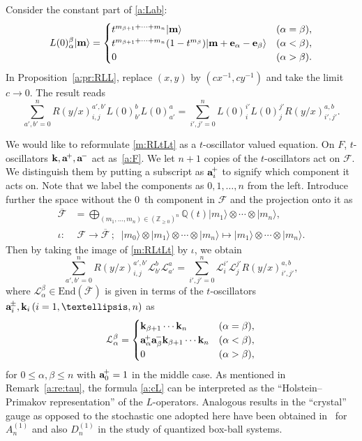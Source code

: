 \documentclass[11pt]{article}
\theoremstyle{definition}
\numberwithin{equation}{section}
\newcommand{\Z}{{\mathbb Z}}
\newcommand{\am}{{\rm\aaa}^{\!-} }
\newcommand{\ap}{{\rm\aaa}^{\!+} }
\newcommand{\apm}{{\rm\aaa}^{\!\pm} }
\newcommand{\F}{\mathcal{F}}
\newcommand{\ket}[1]{\lvert #1 \rangle}
\newcommand{\aaa}{\mathbf{a}}
\newcommand{\kk}{\mathbf{k}}
\begin{document}
Consider the constant part of \eqref{a:Lab}:
\begin{equation} \label{m:Lt}
L(0)_\alpha^\beta \ket{{\bf m}} = \begin{cases}
t^{m_{\beta+1}+\cdots+m_n}\ket{{\bf m}}&(\alpha=\beta),\\
t^{m_{\beta+1}+\cdots+m_n}(1-t^{m_\beta}) \ket{{\bf m}+{\bf e}_\alpha-{\bf e}_\beta} &(\alpha<\beta),\\
0&(\alpha>\beta).
\end{cases}
\end{equation}
%
In Proposition~\ref{a:pr:RLL}, replace $(x,y)$ by $(cx^{-1},cy^{-1})$ and take the limit $c\rightarrow 0$.
The result reads
\begin{equation} \label{m:RLtLt}
\sum_{a',b'=0}^nR(y/x)_{i, j}^{a', b'}L(0)_{b'}^bL(0)_{a'}^a
=\sum_{i',j'=0}^nL(0)_i^{i'}L(0)_j^{j'}R(y/x)_{i', j'}^{a, b}.
\end{equation}

We would like to reformulate \eqref{m:RLtLt} as a $t$-oscillator valued equation. 
On $F$, $t$-oscillators $\kk,\ap,\am$ act as~\eqref{a:F}.
We let $n+1$ copies of the $t$-oscillators act on $\F$. 
We distinguish them by putting a subscript
as $\ap_i$ to signify which component it acts on. Note that we label the components as
$0,1,\ldots,n$ from the left. 
%
Introduce further the space without the $0$~th component in $\F$ and the projection onto it as 
\begin{align}
\overline{\F} &= \bigoplus_{(m_1,\ldots, m_n) \in (\Z_{\ge 0})^n}
\mathbb{Q}(t) |m_1\rangle \otimes \cdots \otimes |m_n\rangle,
\\
\iota \colon & \;  \F \rightarrow \overline{\F}\,;\;\;  
|m_0\rangle \otimes |m_1\rangle \otimes \cdots \otimes |m_n\rangle  
\mapsto  |m_1\rangle \otimes \cdots \otimes |m_n\rangle.
\end{align}
Then by taking the image of \eqref{m:RLtLt} by $\iota$, we obtain
\begin{equation} \label{a:nr}
\sum_{a',b'=0}^nR(y/x)_{i, j}^{a', b'}\mathcal{L}_{b'}^b\mathcal{L}_{a'}^a
=\sum_{i',j'=0}^n\mathcal{L}_i^{i'}\mathcal{L}_j^{j'}R(y/x)_{i', j'}^{a, b},
\end{equation}
where $\mathcal{L}_\alpha^\beta \in \mathrm{End}(\overline{\F})$ is given 
in terms of the $t$-oscillators $\apm_i,\kk_i \, (i=1,\ldots, n)$ as
\begin{equation}\label{a:cL}
\mathcal{L}_\alpha^\beta= \begin{cases}
\kk_{\beta+1}\cdots\kk_n&(\alpha=\beta),\\
\ap_\alpha\am_\beta\kk_{\beta+1}\cdots\kk_n&(\alpha<\beta),\\
0&(\alpha>\beta),
\end{cases}
\end{equation}
for  $0 \le \alpha, \beta \le n$ with $\ap_0=1$ in the middle case.
%
As mentioned in Remark~\ref{a:re:tau}, 
the formula \eqref{a:cL} can be interpreted as  the ``Holstein--Primakov representation'' of the $L$-operators. 
Analogous results in the ``crystal'' gauge as opposed to the stochastic one adopted here 
have been obtained in~\cite{IKO} for $A^{(1)}_n$ and also $D^{(1)}_n$
in the study of quantized box-ball systems.
\end{document}
